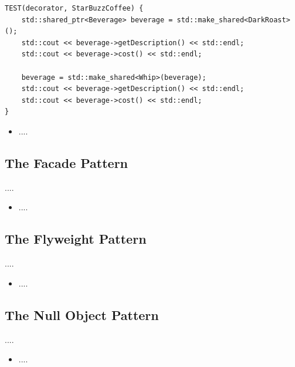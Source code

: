 \documentclass[11pt]{article}
\begin{document}
\begin{itemize}
\begin{multicols}{2}
\begin{lstlisting}
TEST(decorator, StarBuzzCoffee) {
    std::shared_ptr<Beverage> beverage = std::make_shared<DarkRoast>();
    std::cout << beverage->getDescription() << std::endl;
    std::cout << beverage->cost() << std::endl;

    beverage = std::make_shared<Whip>(beverage);
    std::cout << beverage->getDescription() << std::endl;
    std::cout << beverage->cost() << std::endl;
}
            \end{lstlisting}
        \end{multicols}

    \end{itemize}


    \begin{itemize}
        \item ....
    \end{itemize}

    \subsection{The Facade Pattern}
    ....
    \begin{itemize}
        \item ....
    \end{itemize}

    \subsection{The Flyweight Pattern}
    ....
    \begin{itemize}
        \item ....
    \end{itemize}

    \subsection{The Null Object Pattern}
    ....
    \begin{itemize}
        \item ....
    \end{itemize}
\end{document}

